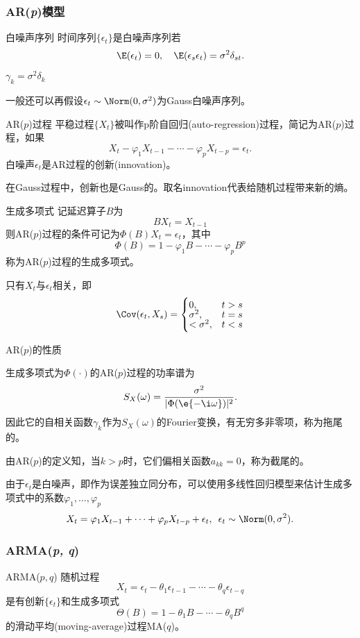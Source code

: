 \subsubsection{AR(\textit{p})模型}
\begin{definition}{白噪声序列}{}
	时间序列$\{\epsilon_t\}$是白噪声序列若
	\[
		\E(\epsilon_t)=0,\quad\E(\epsilon_s\epsilon_t)=\sigma^2\delta_{st}.
	\]
	$\gamma_k=\sigma^2\delta_k$
\end{definition}
一般还可以再假设$\epsilon_t\sim\Norm(0,\sigma^2)$为Gauss白噪声序列。
\begin{definition}{AR($p$)过程}{}
	平稳过程$\{X_t\}$被叫作p阶自回归(auto-regression)过程，简记为AR($p$)过程，如果
	\begin{equation}
		X_t-\varphi_1X_{t-1}-\cdots-\varphi_pX_{t-p}=\epsilon_t.
	\end{equation}
	白噪声$\epsilon_t$是AR过程的创新(innovation)。
\end{definition}
在Gauss过程中，创新也是Gauss的。取名innovation代表给随机过程带来新的熵。
\begin{definition}{生成多项式}{}
	记延迟算子$ B $为
	\[
		BX_t=X_{t-1}
	\]
	则AR($p$)过程的条件可记为$\Phi(B)X_t=\epsilon_t$，其中
	\begin{equation}
		\Phi(B)=1-\varphi_1B-\cdots-\varphi_pB^p
	\end{equation}
	称为AR($p$)过程的生成多项式。
\end{definition}
只有$X_t$与$\epsilon_t$相关，即
\begin{align*}
	\Cov(\epsilon_t,X_s)=\begin{cases}
		0,&t>s\\[-1ex]
		\sigma^2,&t=s\\[-1ex]
		<\sigma^2,&t<s
	\end{cases}
\end{align*}
\begin{theorem}{AR($p$)的性质}{}
	\begin{compactitem}
		\item 生成多项式为$\Phi(\cdot)$的AR($p$)过程的功率谱为
		\[
			S_X(\omega)=\frac{\sigma^2}{|\Phi(\e{-\i\omega})|^2}.
		\]
		因此它的自相关函数$\gamma_k$作为$ S_X(\omega) $的Fourier变换，有无穷多非零项，称为拖尾的。
		\item 由AR($p$)的定义知，当$ k > p $时，它们偏相关函数$ a_{kk} = 0$，称为截尾的。
	\end{compactitem}
\end{theorem}
由于$\epsilon_t$是白噪声，即作为误差独立同分布，可以使用多线性回归模型来估计生成多项式中的系数$\varphi_1,\ldots,\varphi_p$
\[
	X_t=\varphi_1X_{t-1}+\cdots+\varphi_pX_{t-p}+\epsilon_t,\enspace\epsilon_t\sim\Norm(0,\sigma^2).
\]
\subsubsection{ARMA(\textit{p, q})}
\begin{definition}{ARMA($p,q$)}{}
	随机过程
	\[
		X_t=\epsilon_t-\theta_1\epsilon_{t-1}-\cdots-\theta_q\epsilon_{t-q}
	\]
	是有创新$\{\epsilon_t\}$和生成多项式
	\begin{equation}
		\Theta(B)=1-\theta_1B-\cdots-\theta_qB^q
	\end{equation}
	的滑动平均(moving-average)过程MA($q$)。
\end{definition}
